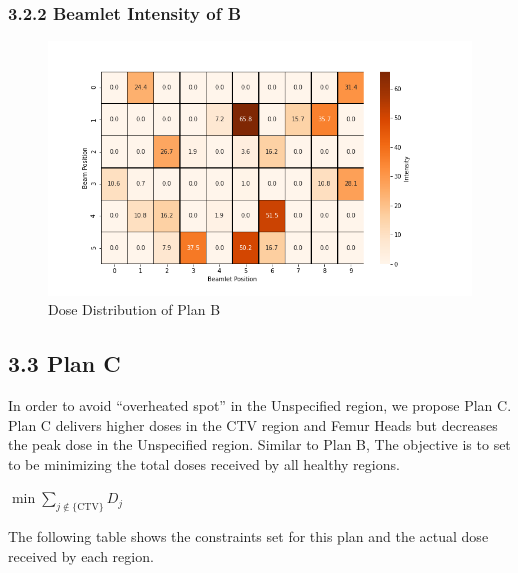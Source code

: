\documentclass{report}
\begin{document}
\subsubsection{3.2.2 Beamlet Intensity of B}

\begin{figure}[H]
    \centering
    \includegraphics[width=0.6\columnwidth]{b-intensity.png}
    \caption{Dose Distribution of Plan B}
    
\end{figure}


\subsection{3.3 Plan C}
In order to avoid ``overheated spot'' in the Unspecified region,  we propose Plan C. Plan C delivers higher doses in the CTV region and Femur Heads but decreases the peak dose in the Unspecified region. Similar to Plan B, The objective is to set to be minimizing the total doses received by all healthy regions.
\begin{center}
    $\min \sum_{j \notin \{\text{CTV}\}} D_j$
\end{center}

The following table shows the constraints set for this plan and the actual dose received by each region.
\end{document}
